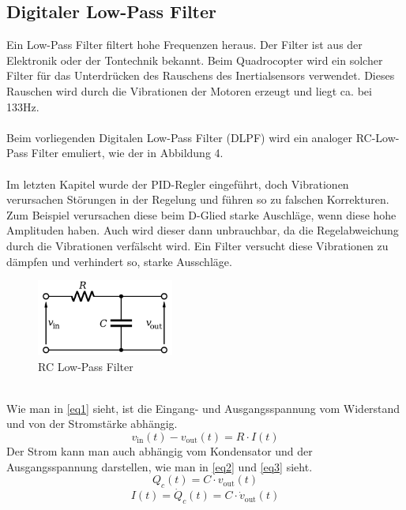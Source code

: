 \documentclass[12pt,a4paper, ngerman]{article}
\begin{document}
\subsection{Digitaler Low-Pass Filter}
Ein Low-Pass Filter filtert hohe Frequenzen heraus. Der Filter ist aus der Elektronik oder der Tontechnik bekannt. Beim Quadrocopter wird ein solcher Filter für das Unterdrücken des Rauschens des Inertialsensors verwendet. Dieses Rauschen wird durch die Vibrationen der Motoren erzeugt und liegt ca. bei 133Hz.\\ \\
Beim vorliegenden Digitalen Low-Pass Filter (DLPF) wird ein analoger RC-Low-Pass Filter emuliert, wie der in Abbildung 4.\cite{website:Wikipedia_LPF}\\ \\
Im letzten Kapitel wurde der PID-Regler eingeführt, doch Vibrationen verursachen Störungen in der Regelung und führen so zu falschen Korrekturen. Zum Beispiel verursachen diese beim D-Glied starke Auschläge, wenn diese hohe Amplituden haben. Auch wird dieser dann unbrauchbar, da die Regelabweichung durch die Vibrationen verfälscht wird. Ein Filter versucht diese Vibrationen zu dämpfen und verhindert so, starke Ausschläge.
\begin{figure}[h]
\centering
\includegraphics[width=0.4\textwidth]{DLPF1.png}
\caption[\url{https://upload.wikimedia.org/wikipedia/commons/e/e0/1st_Order_Lowpass_Filter_RC.svg}]{RC Low-Pass Filter}
\end{figure}\\
Wie man in \ref{eq1} sieht, ist die Eingang- und Ausgangsspannung vom Widerstand und von der Stromstärke abhängig.
\begin{equation} \label{eq1}
v_{\text{in}}(t)-v_{\text{out}}(t)=R\cdot I(t)
\end{equation}
Der Strom kann man auch abhängig vom Kondensator und der Ausgangsspannung darstellen, wie man in \ref{eq2} und \ref{eq3} sieht.
\begin{equation} \label{eq2}
Q_{c}(t)=C\cdot v_{\text{out}}(t)
\end{equation}
\begin{equation} \label{eq3}
I(t)=\dot{Q}_{c}(t)=C\cdot \dot{v}_{\text{out}}(t)
\end{equation}
\end{document}
